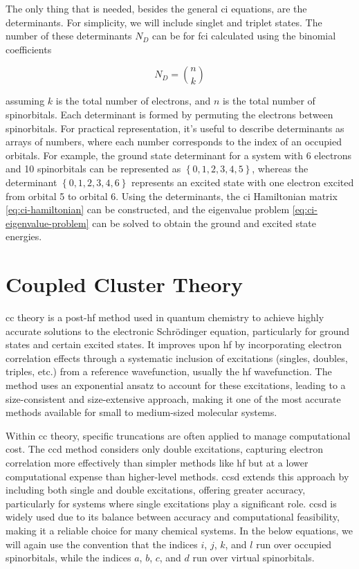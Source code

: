 \documentclass[open=any,parskip=half,11pt]{scrbook}
\begin{document}
The only thing that is needed, besides the general \acrshort{ci} equations, are the determinants. For simplicity, we will include singlet and triplet states. The number of these determinants \(N_D\) can be for \acrshort{fci} calculated using the binomial coefficients

\begin{equation}
N_D=\binom{n}{k}
\end{equation}

assuming \(k\) is the total number of electrons, and \(n\) is the total number of spinorbitals. Each determinant is formed by permuting the electrons between spinorbitals. For practical representation, it's useful to describe determinants as arrays of numbers, where each number corresponds to the index of an occupied orbitals. For example, the ground state determinant for a system with 6 electrons and 10 spinorbitals can be represented as \(\left\lbrace 0,1,2,3,4,5\right\rbrace\), whereas the determinant \(\left\lbrace 0,1,2,3,4,6\right\rbrace\) represents an excited state with one electron excited from orbital 5 to orbital 6. Using the determinants, the \acrshort{ci} Hamiltonian matrix \ref{eq:ci-hamiltonian} can be constructed, and the eigenvalue problem \ref{eq:ci-eigenvalue-problem} can be solved to obtain the ground and excited state energies.
\chapter{Coupled Cluster Theory}\label{coupled-cluster-theory}

\acrfull{cc} theory is a \acrshort{post-hf} method used in quantum chemistry to achieve highly accurate solutions to the electronic Schrödinger equation, particularly for ground states and certain excited states. It improves upon \acrshort{hf} by incorporating electron correlation effects through a systematic inclusion of excitations (singles, doubles, triples, etc.) from a reference wavefunction, usually the \acrshort{hf} wavefunction. The method uses an exponential ansatz to account for these excitations, leading to a size-consistent and size-extensive approach, making it one of the most accurate methods available for small to medium-sized molecular systems.

Within \acrshort{cc} theory, specific truncations are often applied to manage computational cost. The \acrfull{ccd} method considers only double excitations, capturing electron correlation more effectively than simpler methods like \acrshort{hf} but at a lower computational expense than higher-level methods. \acrfull{ccsd} extends this approach by including both single and double excitations, offering greater accuracy, particularly for systems where single excitations play a significant role. \acrshort{ccsd} is widely used due to its balance between accuracy and computational feasibility, making it a reliable choice for many chemical systems. In the below equations, we will again use the convention that the indices \(i\), \(j\), \(k\), and \(l\) run over occupied spinorbitals, while the indices \(a\), \(b\), \(c\), and \(d\) run over virtual spinorbitals.
\end{document}
